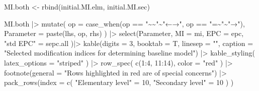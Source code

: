 \documentclass[
]{article}
\newenvironment{Shaded}{\begin{snugshade}}{\end{snugshade}}
\newcommand{\AttributeTok}[1]{\textcolor[rgb]{0.77,0.63,0.00}{#1}}
\newcommand{\DecValTok}[1]{\textcolor[rgb]{0.00,0.00,0.81}{#1}}
\newcommand{\FunctionTok}[1]{\textcolor[rgb]{0.00,0.00,0.00}{#1}}
\newcommand{\NormalTok}[1]{#1}
\newcommand{\OtherTok}[1]{\textcolor[rgb]{0.56,0.35,0.01}{#1}}
\newcommand{\SpecialCharTok}[1]{\textcolor[rgb]{0.00,0.00,0.00}{#1}}
\newcommand{\StringTok}[1]{\textcolor[rgb]{0.31,0.60,0.02}{#1}}
\begin{document}
\begin{Shaded}
\begin{Highlighting}[]
\NormalTok{MI.both }\OtherTok{\textless{}{-}} \FunctionTok{rbind}\NormalTok{(initial.MI.elm, initial.MI.sec)}

\NormalTok{MI.both    }\SpecialCharTok{|\textgreater{}} 
  \FunctionTok{mutate}\NormalTok{(}
    \AttributeTok{op =} \FunctionTok{case\_when}\NormalTok{(op }\SpecialCharTok{==} \StringTok{"\textasciitilde{}\textasciitilde{}"}\SpecialCharTok{\textasciitilde{}}\StringTok{"←→"}\NormalTok{,}
\NormalTok{                   op }\SpecialCharTok{==} \StringTok{"=\textasciitilde{}"}\SpecialCharTok{\textasciitilde{}}\StringTok{"→"}\NormalTok{), }
    \AttributeTok{Parameter =} 
           \FunctionTok{paste}\NormalTok{(lhs, op, rhs)}
\NormalTok{         ) }\SpecialCharTok{|\textgreater{}}
  \FunctionTok{select}\NormalTok{(Parameter, }
         \AttributeTok{MI =}\NormalTok{ mi, }
         \AttributeTok{EPC =}\NormalTok{ epc, }
         \StringTok{"std EPC"} \OtherTok{=}\NormalTok{ sepc.all}
\NormalTok{         )}\SpecialCharTok{|\textgreater{}}
  \FunctionTok{kable}\NormalTok{(}\AttributeTok{digits =} \DecValTok{3}\NormalTok{,}
        \AttributeTok{booktab =}\NormalTok{ T,}
        \AttributeTok{linesep =} \StringTok{""}\NormalTok{,}
        \AttributeTok{caption =} 
          \StringTok{"Selected modification indices for determining baseline model"}\NormalTok{) }\SpecialCharTok{|\textgreater{}}
  \FunctionTok{kable\_styling}\NormalTok{(}
    \AttributeTok{latex\_options =} \StringTok{"striped"}
\NormalTok{    ) }\SpecialCharTok{|\textgreater{}}
  \FunctionTok{row\_spec}\NormalTok{(}
    \FunctionTok{c}\NormalTok{(}\DecValTok{1}\SpecialCharTok{:}\DecValTok{4}\NormalTok{, }\DecValTok{11}\SpecialCharTok{:}\DecValTok{14}\NormalTok{), }
    \AttributeTok{color =} \StringTok{"red"}
\NormalTok{    ) }\SpecialCharTok{|\textgreater{}} 
  \FunctionTok{footnote}\NormalTok{(}\AttributeTok{general =} 
             \StringTok{"Rows highlighted in red are of special concerns"}\NormalTok{) }\SpecialCharTok{|\textgreater{}} 
  \FunctionTok{pack\_rows}\NormalTok{(}\AttributeTok{index =} \FunctionTok{c}\NormalTok{(}
    \StringTok{"Elementary level"} \OtherTok{=} \DecValTok{10}\NormalTok{,}
    \StringTok{"Secondary level"} \OtherTok{=} \DecValTok{10}
\NormalTok{    )}
\NormalTok{    )}
\end{Highlighting}
\end{Shaded}
\end{document}
